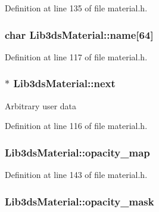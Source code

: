 Definition at line 135 of file material.\-h.

\hypertarget{struct_lib3ds_material_a642032ce784f98df514d26e58ce63282}{
\subsubsection[{name}]{\setlength{\rightskip}{0pt plus 5cm}char Lib3ds\-Material\-::name\mbox{[}64\mbox{]}}}\label{struct_lib3ds_material_a642032ce784f98df514d26e58ce63282}


Definition at line 117 of file material.\-h.

\hypertarget{struct_lib3ds_material_a8fa619b56709cf7db85f57efee5af3ae}{
\subsubsection[{next}]{$\ast$ Lib3ds\-Material\-::next}}\label{struct_lib3ds_material_a8fa619b56709cf7db85f57efee5af3ae}
Arbitrary user data 

Definition at line 116 of file material.\-h.

\hypertarget{struct_lib3ds_material_ae7ad0889da544ee72df0b7702ee29d4e}{
\subsubsection[{opacity\-\_\-map}]{ Lib3ds\-Material\-::opacity\-\_\-map}}\label{struct_lib3ds_material_ae7ad0889da544ee72df0b7702ee29d4e}


Definition at line 143 of file material.\-h.

\hypertarget{struct_lib3ds_material_acd8e2fa50844e83f192fe0958a2a0333}{
\subsubsection[{opacity\-\_\-mask}]{ Lib3ds\-Material\-::opacity\-\_\-mask}}\label{struct_lib3ds_material_acd8e2fa50844e83f192fe0958a2a0333}


